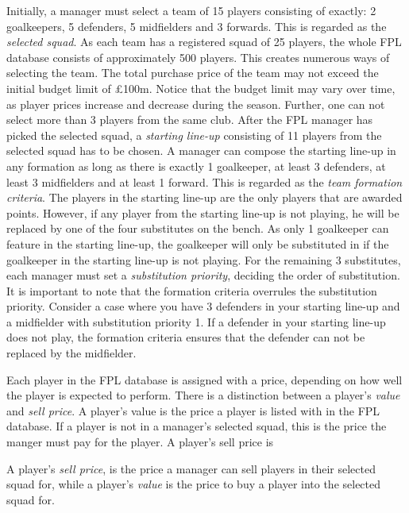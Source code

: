 \newpar

Initially, a manager must select a team of 15 players consisting of exactly: 2 goalkeepers, 5 defenders, 5 midfielders and 3 forwards. This is regarded as the \textit{selected squad}. As each team has a registered squad of 25 players, the whole FPL database consists of approximately 500 players. This creates numerous ways of selecting the team. The total purchase price of the team may not exceed the initial budget limit of \pounds 100m. Notice that the budget limit may vary over time, as player prices increase and decrease during the season. Further, one can not select more than 3 players from the same club. After the FPL manager has picked the selected squad, a \textit{starting line-up} consisting of 11 players from the selected squad has to be chosen. A manager can compose the starting line-up in any formation as long as there is exactly 1 goalkeeper, at least 3 defenders, at least 3 midfielders and at least 1 forward. This is regarded as the \textit{team formation criteria}. The players in the starting line-up are the only players that are awarded points. However, if any player from the starting line-up is not playing, he will be replaced by one of the four substitutes on the bench. As only 1 goalkeeper can feature in the starting line-up, the goalkeeper will only be substituted in if the goalkeeper in the starting line-up is not playing. For the remaining 3 substitutes, each manager must set a \textit{substitution priority}, deciding the order of substitution. It is important to note that the formation criteria overrules the substitution priority. Consider a case where you have 3 defenders in your starting line-up and a midfielder with substitution priority 1. If a defender in your starting line-up does not play, the formation criteria ensures that the defender can not be replaced by the midfielder. 

\newpar

Each player in the FPL database is assigned with a price, depending on how well the player is expected to perform. There is a distinction between a player's \textit{value} and \textit{sell price}. A player's value is the price a player is listed with in the FPL database. If a player is not in a manager's selected squad, this is the price the manger must pay for the player. A player's sell price is 

A player's \textit{sell price}, is the price a manager can sell players in their selected squad for, while a player's \textit{value} is the price to buy a player into the selected squad for.

